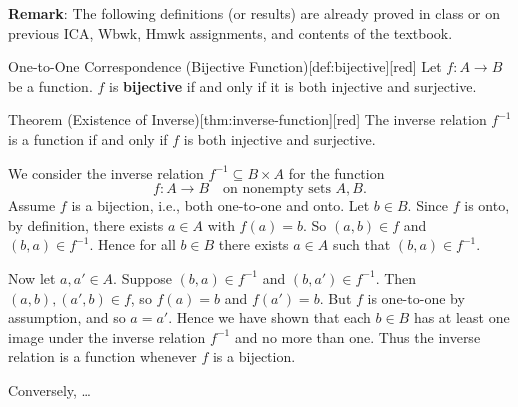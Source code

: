 \textbf{Remark}: The following definitions (or results) are already proved in class or on previous ICA, 
Wbwk, Hmwk assignments, and contents of the textbook.

\begin{define}{One-to-One Correspondence (Bijective Function)}[def:bijective][red]
  Let $f : A \to B$ be a function. $f$ is \textbf{bijective} if and only if it is both injective and surjective.
\end{define}

\begin{define}{Theorem (Existence of Inverse)}[thm:inverse-function][red]
  The inverse relation $f^{-1}$ is a function if and only if $f$ is both injective and surjective.
  \begin{subprove}
    We consider the inverse relation $f^{-1} \subseteq B \times A$ for the function 
    \[
    f : A \to B \quad \text{on nonempty sets $A,B$.}
    \]
    Assume $f$ is a bijection, i.e., both one-to-one and onto. Let $b \in B$. Since $f$ is onto, by definition, there exists $a \in A$ with $f(a) = b$. So $(a,b) \in f$ and $(b,a) \in f^{-1}$. Hence for all $b \in B$ there exists $a \in A$ such that $(b,a) \in f^{-1}$. 

    Now let $a, a' \in A$. Suppose $(b,a) \in f^{-1}$ and $(b,a') \in f^{-1}$. 
    Then $(a,b), (a',b) \in f$, so $f(a) = b$ and $f(a') = b$. 
    But $f$ is one-to-one by assumption, and so $a = a'$. 
    Hence we have shown that each $b \in B$ has at least one image under 
    the inverse relation $f^{-1}$ and no more than one. 
    Thus the inverse relation is a function whenever $f$ is a bijection.

    \medskip
    Conversely, \dots
  \end{subprove}
    
    

\end{define}







